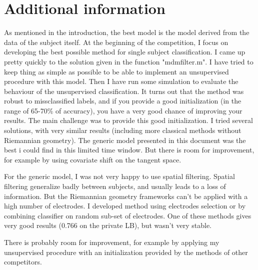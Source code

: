 \documentclass[11pt,a4paper]{article}
\begin{document}
\section{Additional information}
As mentioned in the introduction, the best model is the model derived from the data of the subject itself. At the beginning of the competition, I focus on developing the best possible method for single subject classification. I came up pretty quickly to the solution  given in the function "mdmfilter.m". I have tried to keep thing as simple as possible to be able to implement an unsupervised procedure with this model. Then I have run some simulation to evaluate the behaviour of the unsupervised classification. It turns out that the method was robust to missclassified labels, and if you provide a good initialization (in the range of 65-70\% of accuracy), you have a very good chance of improving your results. The main challenge was to provide this good initialization. I tried several solutions, with very similar results (including more classical methods without Riemannian geometry). The generic model presented in this document was the best i could find in this limited time window. But there is room for improvement, for example by using covariate shift on the tangent space.

For the generic model, I was not very happy to use spatial filtering. Spatial filtering generalize badly between subjects, and usually leads to a loss of information. But the Riemannian geometry frameworks can't be applied with a high number of electrodes. I developed method using electrodes selection or by combining classifier on random sub-set of electrodes. One of these methods gives very good results (0.766 on the private LB), but wasn't very stable.

There is probably room for improvement, for example by applying my unsupervised procedure with an initialization provided by the methods of other competitors.


\end{document}
